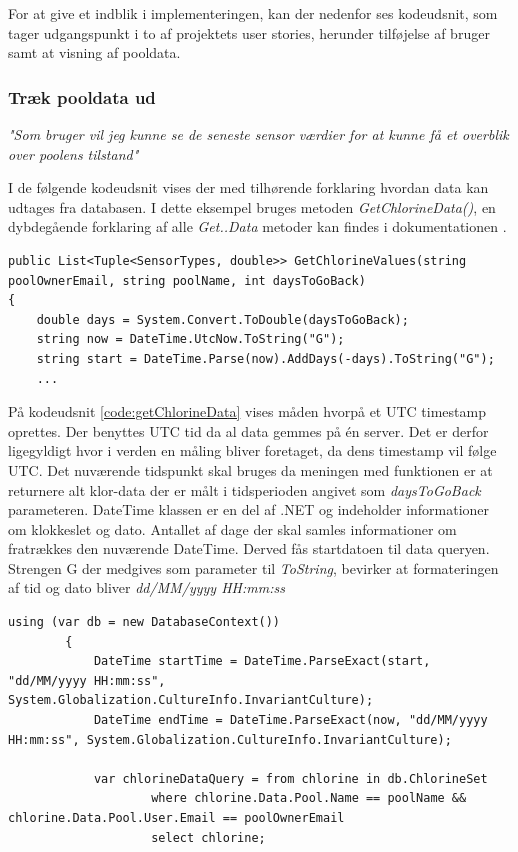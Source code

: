 For at give et indblik i implementeringen, kan der nedenfor ses kodeudsnit, som tager udgangspunkt i to af projektets user stories, herunder tilføjelse af bruger samt at visning af pooldata.

\subsubsection{Træk pooldata ud}

\textit{"Som bruger vil jeg kunne se de seneste sensor værdier for at kunne få et overblik over poolens tilstand"}\

I de følgende kodeudsnit vises der med tilhørende forklaring hvordan data kan udtages fra databasen. I dette eksempel bruges metoden \textit{GetChlorineData()}, en dybdegående forklaring af alle \textit{Get..Data} metoder kan findes i dokumentationen .



\begin{lstlisting}[caption=GetChlorineData method - konvertering af DateTime objekter, label=code:getChlorineData]
public List<Tuple<SensorTypes, double>> GetChlorineValues(string poolOwnerEmail, string poolName, int daysToGoBack)
{
	double days = System.Convert.ToDouble(daysToGoBack);
	string now = DateTime.UtcNow.ToString("G");
	string start = DateTime.Parse(now).AddDays(-days).ToString("G");
	...
\end{lstlisting}

På kodeudsnit \ref{code:getChlorineData} vises måden hvorpå et UTC timestamp oprettes. Der benyttes UTC tid da al data gemmes på én server. Det er derfor ligegyldigt hvor i verden en måling bliver foretaget, da dens timestamp vil følge UTC. Det nuværende tidspunkt skal bruges da meningen med funktionen er at returnere alt klor-data der er målt i tidsperioden angivet som \textit{daysToGoBack} parameteren. DateTime \cite{dotnetdatetime} klassen er en del af .NET og indeholder informationer om klokkeslet og dato. Antallet af dage der skal samles informationer om fratrækkes den nuværende DateTime. Derved fås startdatoen til data queryen. Strengen G der medgives som parameter til \textit{ToString}, bevirker at formateringen af tid og dato bliver \textit{dd/MM/yyyy HH:mm:ss}

\begin{lstlisting}[caption=Konvertering tilbage til DateTime objekter,label=code:convertToDateTime]
using (var db = new DatabaseContext())
		{   
			DateTime startTime = DateTime.ParseExact(start, "dd/MM/yyyy HH:mm:ss", System.Globalization.CultureInfo.InvariantCulture);
			DateTime endTime = DateTime.ParseExact(now, "dd/MM/yyyy HH:mm:ss", System.Globalization.CultureInfo.InvariantCulture);

			var chlorineDataQuery = from chlorine in db.ChlorineSet
					where chlorine.Data.Pool.Name == poolName && chlorine.Data.Pool.User.Email == poolOwnerEmail
					select chlorine;

\end{lstlisting}

